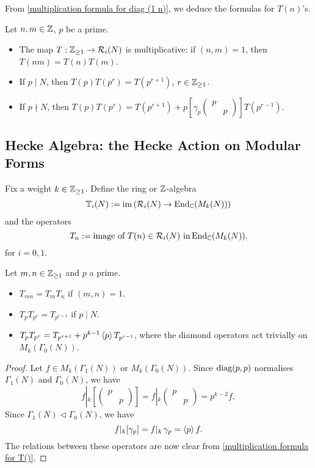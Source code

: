 From \cref{multiplication formula for diag (1 n)}, we deduce the formulas for $T(n)$'s.
\begin{proposition}\label{multiplication formula for T()}
    Let $n, m\in\mathbb{Z}$, $p$ be a prime.\begin{itemize}
\item The map $T : \mathbb{Z}_{\ge 1}\to \mathcal{R}_i(N)$ is multiplicative: if $(n, m) = 1$, then $T(nm) = T(n)T(m)$.
\item If $p\mid N$, then $T(p)T(p^{r}) = T(p^{r + 1})$, $r\in\mathbb{Z}_{\ge 1}$.
\item If $p\nmid N$, then \(T(p)T(p^r) = T(p^{r + 1}) + p \left[ \gamma_p\begin{pmatrix}
    p & \\ & p
\end{pmatrix} \right]T(p^{r-1})\).
    \end{itemize}
\end{proposition}

\subsection{Hecke Algebra: the Hecke Action on Modular Forms}
Fix a weight $k\in\mathbb{Z}_{\ge 1}$.
Define the ring or $\mathbb{Z}$-algebra \begin{align}
    \mathbb{T}_i(N) := \operatorname{im} \left( \mathcal{R}_i(N)\to \operatorname{End}_{\mathbb{C}} (M_k(N))\right)
 \end{align}
and the operators \[    T_n := \text{image of } T(n)\in\mathcal{R}_i(N)\text{ in}\operatorname{End}_{\mathbb{C}}(M_k(N)).
\]
for $i = 0, 1$.

\begin{proposition}
    Let $m, n\in\mathbb{Z}_{\ge 1}$ and $p$ a prime.
    \begin{itemize}
        \item $T_{mn} = T_{m}T_{n}$ if $(m, n) = 1$.
        \item $T_pT_{p^r} = T_{p^{r+1}}$ if $p\mid N$.
        \item $T_pT_{p^r} = T_{p^{r+1}} + p^{k-1}\left\langle p \right\rangle T_{p^{r-1}}$,
        where the diamond operators act trivially on $M_k(\Gamma_0(N))$. 
        \end{itemize}        
\end{proposition}
\begin{proof}
    Let $f\in M_k(\Gamma_1(N))$ or $M_k(\Gamma_0(N))$.
    Since $\operatorname{diag}(p, p)$ normalises $\Gamma_1(N)$ and $\Gamma_0(N)$, we have \[f\left|_k \left[ \begin{pmatrix}
        p & \\ & p
    \end{pmatrix} \right]\right.
     = f\left|_k \begin{pmatrix}
        p & \\ & p
    \end{pmatrix} \right. = p^{k-2}f,\]
    Since $\Gamma_1(N) \vartriangleleft \Gamma_0(N)$,
    we have \[f|_k[\gamma_p] = f|_k\,\gamma_p = \left\langle p \right\rangle f.\]
    The relations between these operators are now clear from \cref{multiplication formula for T()}.
\end{proof}





